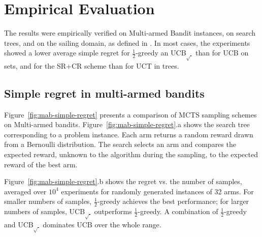 \documentclass[letterpaper]{article}
\begin{document}
\section{Empirical Evaluation}
\label{sec:emp}

The results were empirically verified on Multi-armed Bandit instances,
on search trees, and on the sailing domain, as defined in
\cite{Kocsis.uct}. In most cases, the experiments showed a lower average
simple regret for $\frac 1 2$-greedy an UCB$_{\sqrt{\cdot}}$ than for
UCB on sets, and for the SR+CR scheme than for UCT in trees.

\subsection{Simple regret in multi-armed bandits}
\label{sec:emp-mab}

Figure~\ref{fig:mab-simple-regret} presents a comparison of MCTS sampling
schemes on Multi-armed bandits. Figure~\ref{fig:mab-simple-regret}.a shows the search tree
corresponding to a problem instance. Each arm returns a random reward
drawn from a Bernoulli distribution. The search selects an arm
and compares the expected reward, unknown to the algorithm during the
sampling, to the expected reward of the best arm.

Figure~\ref{fig:mab-simple-regret}.b shows the regret
vs. the number of samples, averaged over $10^4$ experiments for
randomly generated instances of 32 arms. For smaller numbers of
samples, $\frac 1 2$-greedy achieves the best
performance; for larger numbers of samples, UCB$_{\sqrt{\cdot}}$
outperforms $\frac 1 2$-greedy. A combination of $\frac 1
2$-greedy  and UCB$_{\sqrt{\cdot}}$ dominates UCB over the
whole range.
\end{document}
